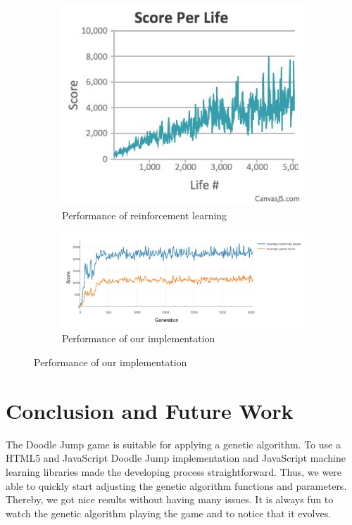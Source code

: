 \documentclass[a4paper,12pt,pagesize,headsepline,bibtotoc,titlepage,abstracton]{scrartcl}
\begin{document}
\begin{figure}
\centering
\begin{subfigure}{.4\textwidth}
  \centering
  \includegraphics[width=\linewidth]{images/performance_others}
  \caption{Performance of reinforcement learning\cite{eshohet}}
  \label{fig:perf_other}
\end{subfigure}%
\begin{subfigure}{.6\textwidth}
  \centering
  \includegraphics[width=\linewidth]{images/our_performance}
  \caption{Performance of our implementation}
  \label{fig:our_perf}
\end{subfigure}
\end{figure}

\section{Conclusion and Future Work}
\label{sec:cafw}

The Doodle Jump game is suitable for applying a genetic algorithm. To use a HTML5 and JavaScript Doodle Jump implementation and JavaScript machine learning libraries made the developing process straightforward. Thus, we were able to quickly start adjusting the genetic algorithm functions and parameters. Thereby, we got nice results without having many issues. It is always fun to watch the genetic algorithm playing the game and to notice that it evolves.
\end{document}
